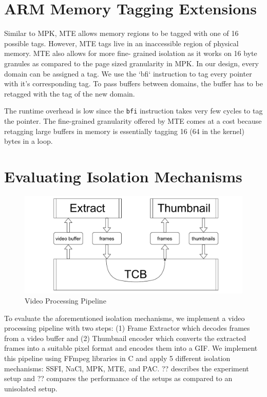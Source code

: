 \section{ARM Memory Tagging Extensions}
Similar to MPK, MTE allows memory regions to be tagged with one of 16 possible tags. However, MTE tags live in an inaccessible region of physical memory. MTE also allows for more fine- grained isolation as it works on 16 byte granules as compared to the page sized granularity in MPK. In our design, every domain can be assigned a tag. We use the ‘bfi‘ instruction to tag every pointer with it’s corresponding tag. To pass buffers between domains, the buffer has to be retagged with the tag of the new domain.

The runtime overhead is low since the \lstinline{bfi} instruction takes very few cycles to tag the pointer. The fine-grained granularity offered by MTE comes at a cost because retagging large buffers in memory is essentially tagging 16 (64 in the kernel) bytes in a loop.

\section{Evaluating Isolation Mechanisms}
\begin{figure}[!htbp]
\includegraphics[width=1.0\columnwidth]{figures/ffmpeg-pipeline.pdf}
\caption{Video Processing Pipeline}
\label{fig:ffmpeg-pipeline}
\end{figure}

To evaluate the aforementioned isolation mechanisms, we implement a video processing pipeline with two steps: (1) Frame Extractor which decodes frames from a video buffer and (2) Thumbnail encoder which converts the extracted frames into a suitable pixel format and encodes them into a GIF. We implement this pipeline using FFmpeg libraries in C and apply 5 different isolation mechanisms: SSFI, NaCl, MPK, MTE, and PAC. ?? describes the experiment setup and ?? compares the performance of the setups as compared to an unisolated setup. 

